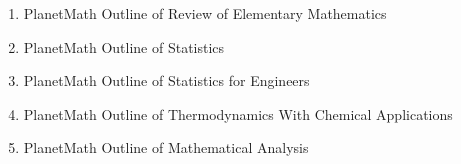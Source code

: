 \documentclass[12pt]{article}
\begin{document}
\begin{enumerate}
\item PlanetMath Outline of Review of Elementary Mathematics
\item PlanetMath Outline of Statistics
\item PlanetMath Outline of Statistics for Engineers
\item PlanetMath Outline of Thermodynamics With Chemical Applications
\item PlanetMath Outline of Mathematical Analysis
\end{enumerate}
\end{document}
